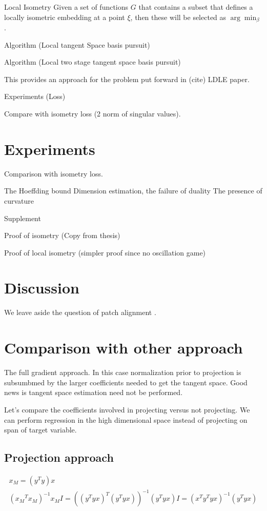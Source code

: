 \documentclass[a4paper,11pt]{article}
\begin{document}
\begin{proposition}{Local Isometry}
Given a set of functions $G$ that contains a subset that defines a locally isometric embedding at a point $\xi$, then these will be selected as $\arg \min_\beta$.
\end{proposition}

Algorithm (Local tangent Space basis pursuit)

Algorithm (Local two stage tangent space basis pursuit)

This provides an approach for the problem put forward in (cite) LDLE paper.

Experiments (Loss)

Compare with isometry loss (2 norm of singular values).

\section{Experiments}

Comparison with isometry loss.

The Hoeffding bound
Dimension estimation, the failure of duality
The presence of curvature

Supplement

Proof of isometry (Copy from thesis)

Proof of local isometry (simpler proof since no oscillation game)

\section{Discussion}

We leave aside the question of patch alignment \cite{https://arxiv.org/pdf/2303.11620.pdf, LDLE paper}.

\section{Comparison with other approach}


The full gradient approach.
In this case normalization prior to projection is subsumbmed by the larger coefficients needed to get the tangent space.
Good news is tangent space estimation need not be performed.

Let's compare the coefficients involved in projecting versus not projecting.
We can perform regression in the high dimensional space instead of projecting on span of target variable.

\subsection{Projection approach}

\begin{align}
x_M = (y^T y) x \\ 
({x_M}^T {x_M})^{-1} {x_M} I = ({(y^T y x)}^T {(y^T y x)})^{-1} {(y^T y x)} I = (x^T y^T y x)^{-1} (y^T y x)
\end{align}
\end{document}
